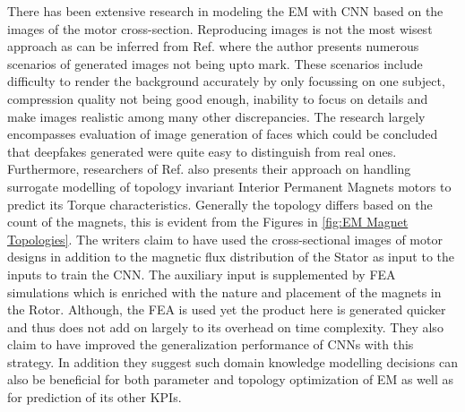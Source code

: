 \documentclass{report} %
\begin{document}
There has been extensive research in modeling the \ac{EM} with \ac{CNN} based on the images of the motor cross-section. Reproducing images is not the most wisest 
approach as can be inferred from Ref. \cite{DFIG-2023} where the author presents numerous scenarios of generated images not being upto mark. These scenarios include 
difficulty to render the background accurately by only focussing on one subject, compression quality not being good enough, inability to focus on details and make 
images realistic among many other discrepancies. The research largely encompasses evaluation of image generation of faces which could be concluded that deepfakes generated were quite easy to 
distinguish from real ones.\\

Furthermore, researchers of Ref. \cite{EM CNN-2024} also presents their approach on handling surrogate modelling of topology invariant Interior 
Permanent Magnets motors to predict its Torque characteristics.
Generally the topology differs based on the count of the magnets, this is evident from the Figures in \ref{fig:EM Magnet Topologies}.
The writers claim to have used the cross-sectional images of motor designs in addition to the magnetic flux distribution of the Stator as input to the
inputs to train the \ac{CNN}. The auxiliary input is supplemented by \ac{FEA} simulations which is enriched with the nature and placement of 
the magnets in the Rotor. Although, the \ac{FEA} is used yet the product here is generated quicker and thus does not add on largely to its overhead on time complexity. 
They also claim to have improved the generalization performance of \ac{CNN}s with this strategy. In addition they suggest such domain knowledge modelling decisions 
can also be beneficial for both parameter and topology optimization of \ac{EM} as well as for prediction of its other \ac{KPI}s.\\
\end{document}
